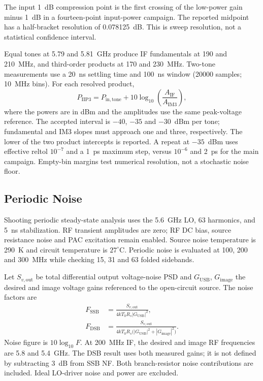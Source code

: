 The input 1~dB compression point is the first crossing of the low-power gain
minus 1~dB in a fourteen-point input-power campaign. The reported midpoint
has a half-bracket resolution of 0.078125~dB. This is sweep resolution, not a
statistical confidence interval.

Equal tones at 5.79 and 5.81~GHz produce IF fundamentals at 190 and 210~MHz,
and third-order products at 170 and 230~MHz. Two-tone measurements use a
20~ns settling time and 100~ns window (20000 samples; 10~MHz bins).
For each resolved product,
\begin{equation}
P_{\mathrm{IIP3}}=P_{\mathrm{in,tone}}
+10\log_{10}\!\left(\frac{A_{\mathrm{IF}}}{A_{\mathrm{IM3}}}\right),
\label{eq:iip3}\end{equation}
where the powers are in dBm and the amplitudes use the same peak-voltage
reference. The accepted interval is $-40$, $-35$ and $-30$~dBm per tone;
fundamental and IM3 slopes must approach one and three, respectively.
The lower of the two product intercepts is reported. A repeat at $-35$~dBm
uses effective reltol $10^{-7}$ and a 1~ps maximum step, versus $10^{-6}$ and
2~ps for the main campaign. Empty-bin margins test numerical resolution,
not a stochastic noise floor.

\subsection{Periodic Noise}
Shooting periodic steady-state analysis uses the 5.6~GHz LO, 63 harmonics,
and 5~ns stabilization. RF transient amplitudes are zero; RF DC bias, source
resistance noise and PAC excitation remain enabled. Source noise temperature
is 290~K and circuit temperature is $27^\circ$C. Periodic noise is evaluated
at 100, 200 and 300~MHz while checking 15, 31 and 63 folded sidebands.

Let $S_{v,\mathrm{out}}$ be total differential output voltage-noise PSD and
$G_{\mathrm{USB}}$, $G_{\mathrm{image}}$ the desired and image voltage gains
referenced to the open-circuit source. The noise factors are
\begin{align}
F_{\mathrm{SSB}}&=\frac{S_{v,\mathrm{out}}}{4kT_0R_s|G_{\mathrm{USB}}|^2},
\label{eq:ssb}\\
F_{\mathrm{DSB}}&=\frac{S_{v,\mathrm{out}}}
{4kT_0R_s\bigl(|G_{\mathrm{USB}}|^2+|G_{\mathrm{image}}|^2\bigr)}.
\label{eq:dsb}\end{align}
Noise figure is $10\log_{10}F$. At 200~MHz IF, the desired and image RF
frequencies are 5.8 and 5.4~GHz. The DSB result uses both measured gains;
it is not defined by subtracting 3~dB from SSB NF. Both branch-resistor noise
contributions are included. Ideal LO-driver noise and power are excluded.
